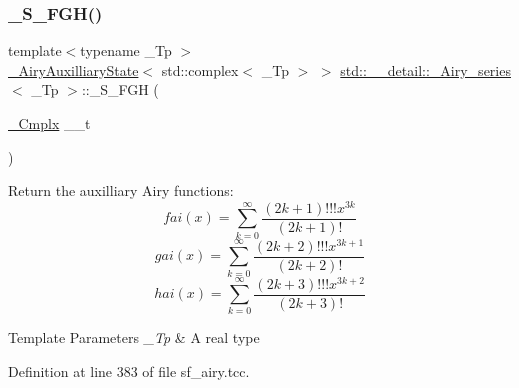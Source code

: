 \mbox{\label{classstd_1_1____detail_1_1__Airy__series_ae3b42646089ac6a58bb4e4be18d784ec}} 
\subsubsection{\texorpdfstring{\+\_\+\+S\+\_\+\+F\+G\+H()}{\_S\_FGH()}}
{\footnotesize\ttfamily template$<$typename \+\_\+\+Tp $>$ \\
\hyperlink{structstd_1_1____detail_1_1__AiryAuxilliaryState}{\+\_\+\+Airy\+Auxilliary\+State}$<$ std\+::complex$<$ \+\_\+\+Tp $>$ $>$ \hyperlink{classstd_1_1____detail_1_1__Airy__series}{std\+::\+\_\+\+\_\+detail\+::\+\_\+\+Airy\+\_\+series}$<$ \+\_\+\+Tp $>$\+::\+\_\+\+S\+\_\+\+F\+GH (\begin{DoxyParamCaption}\item[{\hyperlink{classstd_1_1____detail_1_1__Airy__series_ab41161caa54609f4735987fbaed41d9d}{\+\_\+\+Cmplx}}]{\+\_\+\+\_\+t }\end{DoxyParamCaption})\hspace{0.3cm}{\ttfamily [static]}}

Return the auxilliary Airy functions\+: \[ fai(x) = \sum_{k=0}^\infty \frac{(2k+1)!!!x^{3k}}{(2k+1)!} \] \[ gai(x) = \sum_{k=0}^\infty \frac{(2k+2)!!!x^{3k+1}}{(2k+2)!} \] \[ hai(x) = \sum_{k=0}^\infty \frac{(2k+3)!!!x^{3k+2}}{(2k+3)!} \]


\begin{DoxyTemplParams}{Template Parameters}
{\em \+\_\+\+Tp} & A real type \\
\hline
\end{DoxyTemplParams}


Definition at line 383 of file sf\+\_\+airy.\+tcc.

\mbox{\label{classstd_1_1____detail_1_1__Airy__series_a70314b5de10d149481db61d30ded43d5}} 
